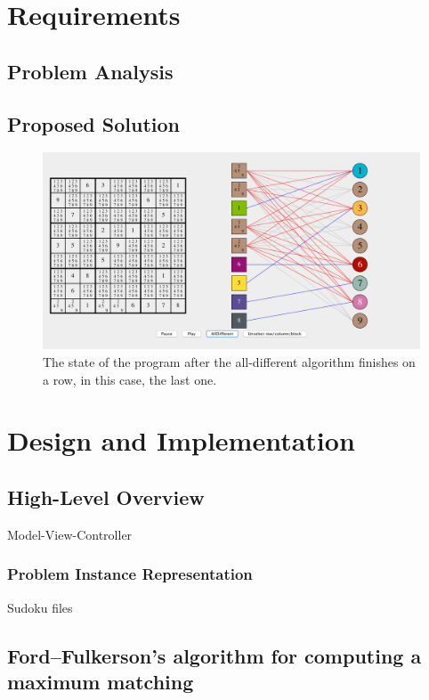 \documentclass{l4proj}
\begin{document}
\chapter{Requirements}
\label{reqs}
\section{Problem Analysis}


\section{Proposed Solution}

\begin{figure}[H]
\centering
\includegraphics[width=13.2cm]{screenshot.png}
\caption{The state of the program after the all-different algorithm finishes on a row, in this case, the last one.}
\end{figure}



\chapter{Design and Implementation}
\label{design}

\section{High-Level Overview}
Model-View-Controller

\subsection{Problem Instance Representation}
Sudoku files

\section{Ford–Fulkerson's algorithm for computing a maximum matching}
\end{document}
